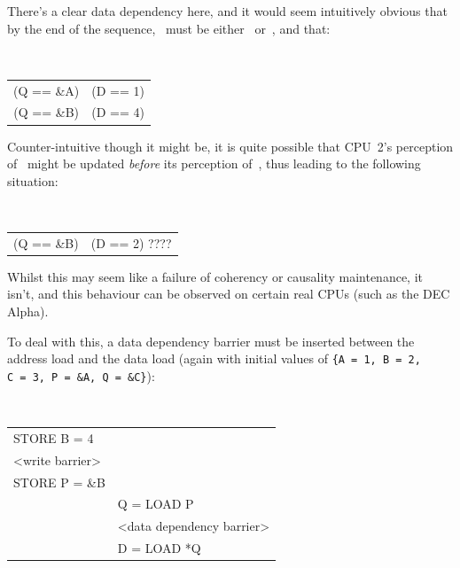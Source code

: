 There's a clear data dependency here, and it would seem intuitively
obvious that by the end of the sequence, ~must be either~
or~, and that:

\vspace{5pt}
\begin{minipage}[t]{\columnwidth}
\tt
\scriptsize
\begin{tabular}{c@{ implies }c}
	(Q == \&A) & (D == 1) \\
	(Q == \&B) & (D == 4) \\
\end{tabular}
\end{minipage}
\vspace{5pt}

Counter-intuitive though it might be, it is quite possible that
CPU~2's perception of~ might be updated \emph{before} its perception
of~, thus leading to the following situation:

\vspace{5pt}
\begin{minipage}[t]{\columnwidth}
\tt
\scriptsize
\begin{tabular}{c@{ and }c}
	(Q == \&B) & (D == 2) ???? \\
\end{tabular}
\end{minipage}
\vspace{5pt}

Whilst this may seem like a failure of coherency or causality maintenance, it
isn't, and this behaviour can be observed on certain real CPUs (such as the DEC
Alpha).

To deal with this, a data dependency barrier must be inserted between the
address load and the data load (again with initial values of
{\tt \{A~=~1, B~=~2, C~=~3, P~=~\&A, Q~=~\&C\}}):

\vspace{5pt}
\begin{minipage}[t]{\columnwidth}
\tt
\scriptsize
\begin{tabular}{l|p{1.5in}}
	\nf{CPU 1}	& \nf{CPU 2} \\
	\hline
	STORE B = 4	& \\
	<write barrier>	& \\
	STORE P = \&B	& \\
			& Q = LOAD P \\
			& <data dependency barrier> \\
			& D = LOAD *Q \\
\end{tabular}
\end{minipage}
\vspace{5pt}

